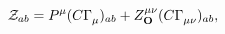\begin{equation}\label{eq1}
  {\cal{Z}}_{ab} = P^\mu (C\Gamma^{}_\mu)_{ab} +
   Z^{\mu\nu}_{\bf{O}} (C\Gamma^{}_{\mu\nu})_{ab}
   ,
\end{equation}

